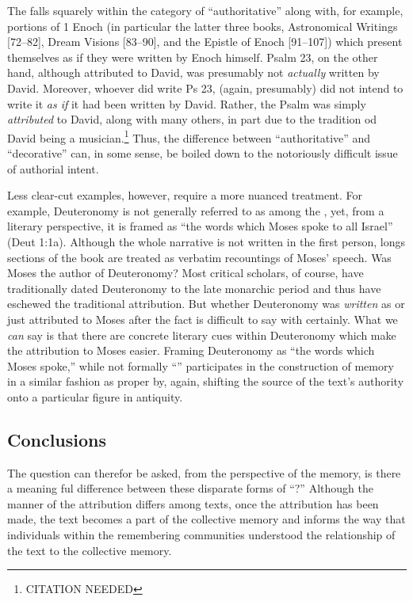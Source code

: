 The \ga falls squarely within the category of ``authoritative'' \psy along with, for example, portions of 1 Enoch (in particular the latter three books, Astronomical Writings [72--82], Dream Visions [83--90], and the Epistle of Enoch [91--107]) which present themselves as if they were written by Enoch himself. Psalm 23, on the other hand, although attributed to David, was presumably not \emph{actually} written by David. Moreover, whoever did write Ps 23, (again, presumably) did not intend to write it \emph{as if} it had been written by David. Rather, the Psalm was simply \emph{attributed} to David, along with many others, in part due to the tradition od David being a musician.\footnote{CITATION NEEDED} Thus, the difference between ``authoritative'' and ``decorative'' \psy can, in some sense, be boiled down to the notoriously difficult issue of authorial intent.

Less clear-cut examples, however, require a more nuanced treatment. For example, Deuteronomy is not generally referred to as among the \psa, yet, from a literary perspective, it is framed as 
``the words which Moses spoke to all Israel'' (Deut 1:1a). Although the whole narrative is not written in the first person, longs sections of the book are treated as verbatim recountings of Moses' speech. Was Moses the author of Deuteronomy? Most critical scholars, of course, have traditionally dated Deuteronomy to the late monarchic period and thus have eschewed the traditional attribution. But whether Deuteronomy was \emph{written} as \psa or just attributed to Moses after the fact is difficult to say with certainly. What we \emph{can} say is that there are concrete literary cues within Deuteronomy which make the attribution to Moses easier. Framing Deuteronomy as ``the words which Moses spoke,'' while not formally ``\psa'' participates in the construction of memory in a similar fashion as \psa proper by, again, shifting the source of the text's authority onto a particular figure in antiquity.


\subsection{Conclusions}
The question can therefor be asked, from the perspective of the memory, is there a meaning ful difference between these disparate forms of ``\psy?'' Although the manner of the attribution differs among \psgraphic texts, once the attribution has been made, the text becomes a part of the collective memory and informs the way that individuals within the remembering communities understood the relationship of the text to the collective memory.